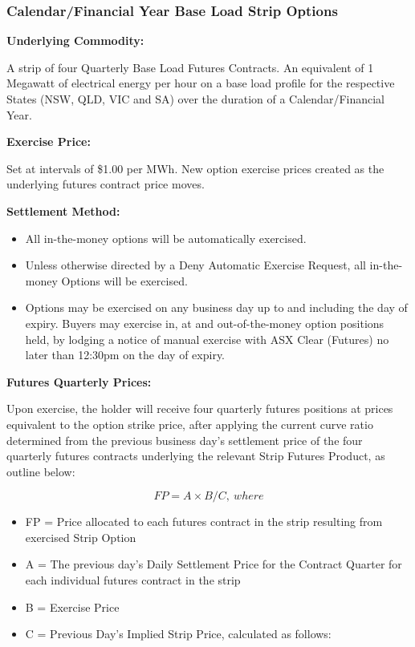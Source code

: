 \documentclass[12pt]{article}
\begin{document}
\subsubsection{Calendar/Financial Year Base Load Strip Options}
\begin{flushleft}
\textbf{Underlying Commodity:}\par
A strip of four Quarterly Base Load Futures Contracts. An equivalent of 1 Megawatt of electrical energy per hour on a base load profile for the respective States (NSW, QLD, VIC and SA) over the duration of a Calendar/Financial Year. \par
\textbf{Exercise Price:} \par
Set at intervals of \$1.00 per MWh. New option exercise prices
created as the underlying futures contract price moves.\par
\textbf{Settlement Method:} \par
\begin{itemize}
    \item All in-the-money options will be automatically exercised.
    \item Unless otherwise directed by a Deny Automatic Exercise Request, all in-the-money Options will be exercised.
    \item Options may be exercised on any business day up to and including the day of expiry. Buyers may exercise in, at and out-of-the-money option positions held, by lodging a notice of manual exercise with ASX Clear (Futures) no later than 12:30pm on the day of expiry. 
\end{itemize}
\textbf{Futures Quarterly Prices:} \par
Upon exercise, the holder will receive four quarterly futures positions at prices equivalent to the option strike price, after applying the current curve ratio determined from the previous business day’s settlement price of the four quarterly futures contracts underlying the relevant Strip Futures Product, as outline below: \par
$$ FP = A \times B/C, \ where $$
\begin{itemize}
    \item FP = Price allocated to each futures contract in the strip resulting from exercised Strip Option
    \item A = The previous day’s Daily Settlement Price for the Contract Quarter for each individual futures contract in the strip
    \item B = Exercise Price
    \item C = Previous Day’s Implied Strip Price, calculated as follows:

\end{itemize}
\end{flushleft}
\end{document}
